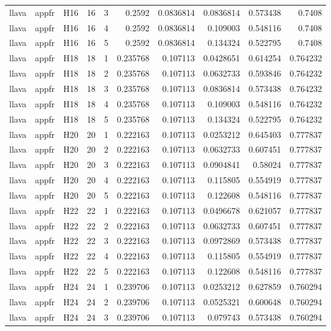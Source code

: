 \begin{longtable}{lllrrrrrrr}
llava & appfr & H16 & 16 & 3 & 0.2592 & 0.0836814 & 0.0836814 & 0.573438 & 0.7408 \\
llava & appfr & H16 & 16 & 4 & 0.2592 & 0.0836814 & 0.109003 & 0.548116 & 0.7408 \\
llava & appfr & H16 & 16 & 5 & 0.2592 & 0.0836814 & 0.134324 & 0.522795 & 0.7408 \\
llava & appfr & H18 & 18 & 1 & 0.235768 & 0.107113 & 0.0428651 & 0.614254 & 0.764232 \\
llava & appfr & H18 & 18 & 2 & 0.235768 & 0.107113 & 0.0632733 & 0.593846 & 0.764232 \\
llava & appfr & H18 & 18 & 3 & 0.235768 & 0.107113 & 0.0836814 & 0.573438 & 0.764232 \\
llava & appfr & H18 & 18 & 4 & 0.235768 & 0.107113 & 0.109003 & 0.548116 & 0.764232 \\
llava & appfr & H18 & 18 & 5 & 0.235768 & 0.107113 & 0.134324 & 0.522795 & 0.764232 \\
llava & appfr & H20 & 20 & 1 & 0.222163 & 0.107113 & 0.0253212 & 0.645403 & 0.777837 \\
llava & appfr & H20 & 20 & 2 & 0.222163 & 0.107113 & 0.0632733 & 0.607451 & 0.777837 \\
llava & appfr & H20 & 20 & 3 & 0.222163 & 0.107113 & 0.0904841 & 0.58024 & 0.777837 \\
llava & appfr & H20 & 20 & 4 & 0.222163 & 0.107113 & 0.115805 & 0.554919 & 0.777837 \\
llava & appfr & H20 & 20 & 5 & 0.222163 & 0.107113 & 0.122608 & 0.548116 & 0.777837 \\
llava & appfr & H22 & 22 & 1 & 0.222163 & 0.107113 & 0.0496678 & 0.621057 & 0.777837 \\
llava & appfr & H22 & 22 & 2 & 0.222163 & 0.107113 & 0.0632733 & 0.607451 & 0.777837 \\
llava & appfr & H22 & 22 & 3 & 0.222163 & 0.107113 & 0.0972869 & 0.573438 & 0.777837 \\
llava & appfr & H22 & 22 & 4 & 0.222163 & 0.107113 & 0.115805 & 0.554919 & 0.777837 \\
llava & appfr & H22 & 22 & 5 & 0.222163 & 0.107113 & 0.122608 & 0.548116 & 0.777837 \\
llava & appfr & H24 & 24 & 1 & 0.239706 & 0.107113 & 0.0253212 & 0.627859 & 0.760294 \\
llava & appfr & H24 & 24 & 2 & 0.239706 & 0.107113 & 0.0525321 & 0.600648 & 0.760294 \\
llava & appfr & H24 & 24 & 3 & 0.239706 & 0.107113 & 0.079743 & 0.573438 & 0.760294 \\

\end{longtable}
